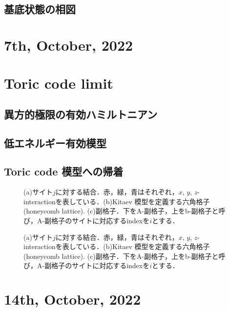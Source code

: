 \documentclass[dvipdfmx,autodetect-engine]{jsarticle}
\begin{document}
\subsection{基底状態の相図}

\section*{7th, October, 2022}
\section{Toric code limit}
\subsection{異方的極限の有効ハミルトニアン}

\subsection{低エネルギー有効模型}


\subsection{Toric code 模型への帰着}
\begin{figure}[h]
\centering
\caption{(a)サイト$j$に対する結合．赤，緑，青はそれぞれ，$x$, $y$, $z$-interactionを表している．(b)Kitaev 模型を定義する六角格子 (honeycomb lattice).
(c)副格子．下をA-副格子，上をb-副格子と呼び，A-副格子のサイトに対応するindexを$i$とする．}
\label{fig:schematic1}
\end{figure}


\begin{figure}[h]
\centering
\caption{(a)サイト$j$に対する結合．赤，緑，青はそれぞれ，$x$, $y$, $z$-interactionを表している．(b)Kitaev 模型を定義する六角格子 (honeycomb lattice).
(c)副格子．下をA-副格子，上をb-副格子と呼び，A-副格子のサイトに対応するindexを$i$とする．}
\label{fig:schematic1}
\end{figure}



\section*{14th, October, 2022}
\end{document}

